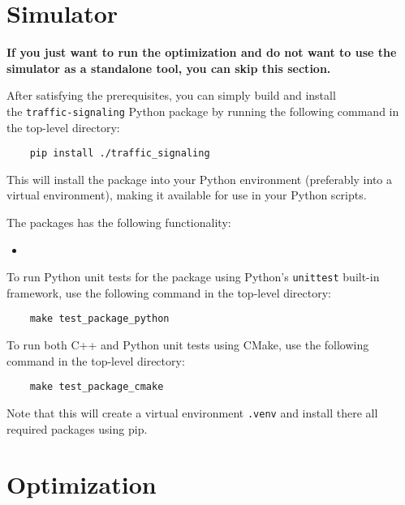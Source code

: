 \newpage

\section{Simulator}

\textbf{If you just want to run the optimization and do not want to use the simulator as a standalone tool, you can skip this section.}

\bigskip

After satisfying the prerequisites, you can simply build and install \\
the \verb|traffic-signaling| Python package by running the following command in the top-level directory:
\begin{verbatim}
    pip install ./traffic_signaling
\end{verbatim}
This will install the package into your Python environment (preferably into a virtual environment), making it available for use in your Python scripts.

The packages has the following functionality:
\begin{itemize}
    \item {}
\end{itemize}

\bigskip

To run Python unit tests for the package using Python's \verb|unittest| built-in framework, use the following command in the top-level directory:
\begin{verbatim}
    make test_package_python
\end{verbatim}
To run both C++ and Python unit tests using CMake, use the following command in the top-level directory:
\begin{verbatim}
    make test_package_cmake
\end{verbatim}
Note that this will create a virtual environment \verb|.venv| and install there all required packages using pip.

\section{Optimization}

